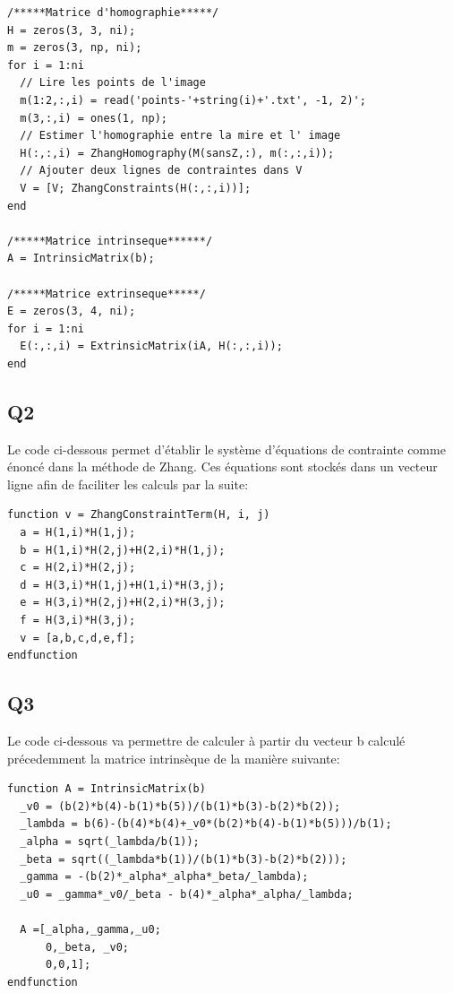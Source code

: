 \documentclass[a4paper,12pt]{report}
\begin{document}
\begin{lstlisting}[style=Scilab]
/*****Matrice d'homographie*****/
H = zeros(3, 3, ni);
m = zeros(3, np, ni);
for i = 1:ni
  // Lire les points de l'image
  m(1:2,:,i) = read('points-'+string(i)+'.txt', -1, 2)';
  m(3,:,i) = ones(1, np);
  // Estimer l'homographie entre la mire et l' image
  H(:,:,i) = ZhangHomography(M(sansZ,:), m(:,:,i));
  // Ajouter deux lignes de contraintes dans V
  V = [V; ZhangConstraints(H(:,:,i))];
end

/*****Matrice intrinseque******/
A = IntrinsicMatrix(b);

/*****Matrice extrinseque*****/
E = zeros(3, 4, ni);
for i = 1:ni
  E(:,:,i) = ExtrinsicMatrix(iA, H(:,:,i));
end 
\end{lstlisting}

\subsection*{Q2}

Le code ci-dessous permet d'établir le système d'équations de contrainte comme énoncé dans la méthode de Zhang. Ces équations sont stockés dans un vecteur ligne afin de faciliter les calculs par la suite: 
\begin{lstlisting}[style=Scilab]
function v = ZhangConstraintTerm(H, i, j)
  a = H(1,i)*H(1,j);
  b = H(1,i)*H(2,j)+H(2,i)*H(1,j);
  c = H(2,i)*H(2,j);
  d = H(3,i)*H(1,j)+H(1,i)*H(3,j);
  e = H(3,i)*H(2,j)+H(2,i)*H(3,j);
  f = H(3,i)*H(3,j);
  v = [a,b,c,d,e,f];
endfunction
\end{lstlisting}

\subsection*{Q3}
Le code ci-dessous va permettre de calculer à partir du vecteur b calculé précedemment la matrice intrinsèque de la manière suivante:
\begin{lstlisting}[style=Scilab]
function A = IntrinsicMatrix(b)
  _v0 = (b(2)*b(4)-b(1)*b(5))/(b(1)*b(3)-b(2)*b(2));
  _lambda = b(6)-(b(4)*b(4)+_v0*(b(2)*b(4)-b(1)*b(5)))/b(1);
  _alpha = sqrt(_lambda/b(1));
  _beta = sqrt((_lambda*b(1))/(b(1)*b(3)-b(2)*b(2)));
  _gamma = -(b(2)*_alpha*_alpha*_beta/_lambda);
  _u0 = _gamma*_v0/_beta - b(4)*_alpha*_alpha/_lambda; 
  
  A =[_alpha,_gamma,_u0;
      0,_beta, _v0;
      0,0,1];
endfunction
\end{lstlisting}
\end{document}
